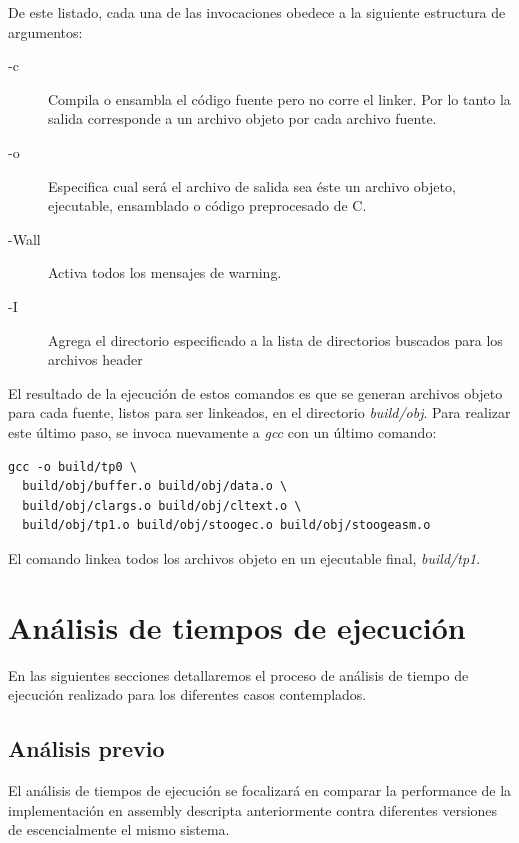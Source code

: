 \documentclass[a4paper,11pt]{article}
\begin{document}
De este listado, cada una de las invocaciones obedece a la siguiente estructura
de argumentos:

\begin{description}

  \item[-c] Compila o ensambla el código fuente pero no corre el linker.  Por
    lo tanto la salida corresponde a un archivo objeto por cada archivo fuente.

  \item[-o] Especifica cual será el archivo de salida sea éste un archivo
    objeto, ejecutable, ensamblado o código preprocesado de C.

  \item[-Wall] Activa todos los mensajes de warning.

  \item[-I] Agrega el directorio especificado a la lista de directorios
    buscados para los archivos header

\end{description}

El resultado de la ejecución de estos comandos es que se generan archivos
objeto para cada fuente, listos para ser linkeados, en el directorio
\textit{build/obj}. Para realizar este último paso, se invoca nuevamente a
\textit{gcc} con un último comando:

\begin{lstlisting}
gcc -o build/tp0 \
  build/obj/buffer.o build/obj/data.o \
  build/obj/clargs.o build/obj/cltext.o \
  build/obj/tp1.o build/obj/stoogec.o build/obj/stoogeasm.o
\end{lstlisting}

El comando linkea todos los archivos objeto en un ejecutable final,
\textit{build/tp1}.

\section{Análisis de tiempos de ejecución}

En las siguientes secciones detallaremos el proceso de análisis de tiempo de
ejecución realizado para los diferentes casos contemplados.

\subsection{Análisis previo}\label{sec:tiempos}

El análisis de tiempos de ejecución se focalizará en comparar la performance de la implementación en assembly descripta anteriormente contra diferentes versiones de escencialmente el mismo sistema.
\end{document}
